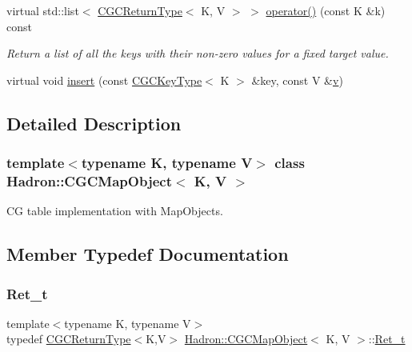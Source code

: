 \begin{DoxyCompactItemize}
virtual std\+::list$<$ \mbox{\hyperlink{structHadron_1_1CGCReturnType}{C\+G\+C\+Return\+Type}}$<$ K, V $>$ $>$ \mbox{\hyperlink{classHadron_1_1CGCMapObject_aeb342dc81f17743a25b969f540db4edf}{operator()}} (const K \&k) const
\begin{DoxyCompactList}\small\item\em Return a list of all the keys with their non-\/zero values for a fixed target value. \end{DoxyCompactList}\item 
virtual void \mbox{\hyperlink{classHadron_1_1CGCMapObject_a334a88a21755a64719b1081190d2bde2}{insert}} (const \mbox{\hyperlink{structHadron_1_1CGCKeyType}{C\+G\+C\+Key\+Type}}$<$ K $>$ \&key, const V \&\mbox{\hyperlink{hadron__timeslice_8cc_a716fc87f5e814be3ceee2405ed6ff22a}{v}})
\end{DoxyCompactItemize}


\subsection{Detailed Description}
\subsubsection*{template$<$typename K, typename V$>$\newline
class Hadron\+::\+C\+G\+C\+Map\+Object$<$ K, V $>$}

CG table implementation with Map\+Objects. 

\subsection{Member Typedef Documentation}
\mbox{\label{classHadron_1_1CGCMapObject_a154c1c2b41f7dad9d5692b4d2c6f5a2c}} 
\subsubsection{\texorpdfstring{Ret\_t}{Ret\_t}\hspace{0.1cm}{\footnotesize\ttfamily [1/2]}}
{\footnotesize\ttfamily template$<$typename K, typename V$>$ \\
typedef \mbox{\hyperlink{structHadron_1_1CGCReturnType}{C\+G\+C\+Return\+Type}}$<$K,V$>$ \mbox{\hyperlink{classHadron_1_1CGCMapObject}{Hadron\+::\+C\+G\+C\+Map\+Object}}$<$ K, V $>$\+::\mbox{\hyperlink{classHadron_1_1CGCMapObject_a154c1c2b41f7dad9d5692b4d2c6f5a2c}{Ret\+\_\+t}}}

